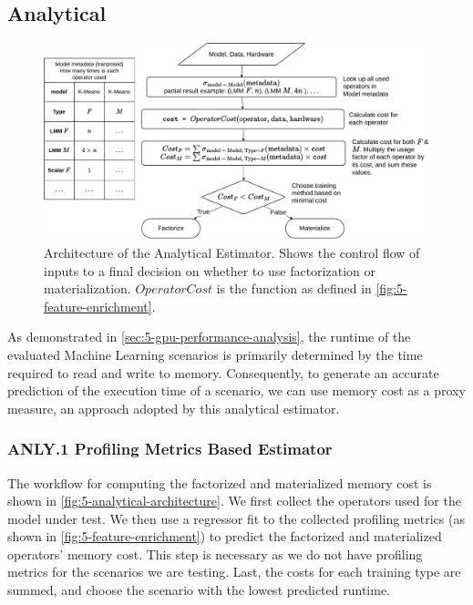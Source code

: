 \subsection{Analytical}
\label{subsec:5-analytical}
\begin{figure}[ht]
    \centering
    \includegraphics[width=\linewidth]{chapters/05_cost_estimation/figures/analytical-architecture.pdf}
    \caption[Analytical Estimator Architecture]{Architecture of the Analytical Estimator. Shows the control flow of inputs to a final decision on whether to use factorization or materialization. $OperatorCost$ is the function as defined in \autoref{fig:5-feature-enrichment}.}
    \label{fig:5-analytical-architecture}
\end{figure}

As demonstrated in \autoref{sec:5-gpu-performance-analysis}, the runtime of the evaluated Machine Learning scenarios is primarily determined by the time required to read and write to memory. Consequently, to generate an accurate prediction of the execution time of a scenario, we can use memory cost as a proxy measure, an approach adopted by this analytical estimator.

\subsubsection*{ANLY.1 Profiling Metrics Based Estimator}
The workflow for computing the factorized and materialized memory cost is shown in \autoref{fig:5-analytical-architecture}. We first collect the operators used for the model under test. We then use a regressor fit to the collected profiling metrics (as shown in \autoref{fig:5-feature-enrichment}) to predict the factorized and materialized operators' memory cost. This step is necessary as we do not have profiling metrics for the scenarios we are testing. Last, the costs for each training type are summed, and choose the scenario with the lowest predicted runtime.

